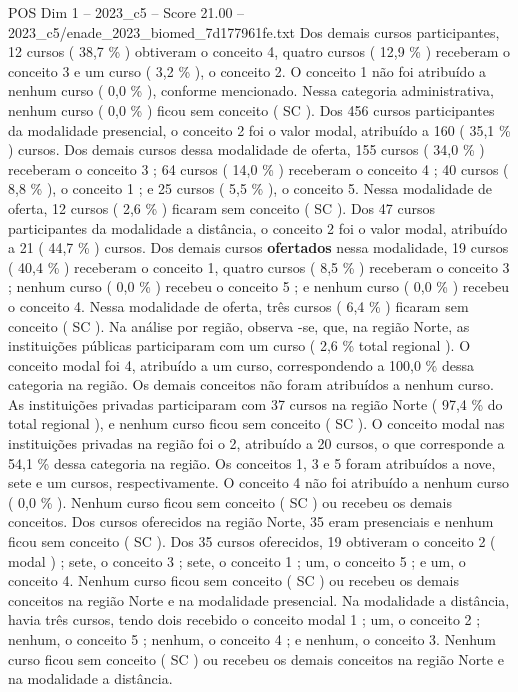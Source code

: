 \begin{textsample}{POS Dim 1 – 2023\_c5 – Score 21.00 – 2023\_c5/enade\_2023\_biomed\_7d177961fe.txt}
Dos demais cursos participantes, 12 cursos ( 38,7 \% ) obtiveram o conceito 4, quatro cursos ( 12,9 \% ) receberam o conceito 3 e um curso ( 3,2 \% ), o conceito 2.
O conceito 1 não foi atribuído a nenhum curso ( 0,0 \% ), conforme mencionado.
Nessa categoria administrativa, nenhum curso ( 0,0 \% ) ficou sem conceito ( SC ).
Dos 456 cursos participantes da modalidade presencial, o conceito 2 foi o valor modal, atribuído a 160 ( 35,1 \% ) cursos.
Dos demais cursos dessa modalidade de oferta, 155 cursos ( 34,0 \% ) receberam o conceito 3 ; 64 cursos ( 14,0 \% ) receberam o conceito 4 ; 40 cursos ( 8,8 \% ), o conceito 1 ; e 25 cursos ( 5,5 \% ), o conceito 5.
Nessa modalidade de oferta, 12 cursos ( 2,6 \% ) ficaram sem conceito ( SC ).
Dos 47 cursos participantes da modalidade a distância, o conceito 2 foi o valor modal, atribuído a 21 ( 44,7 \% ) cursos.
Dos demais cursos \textbf{ofertados} nessa modalidade, 19 cursos ( 40,4 \% ) receberam o conceito 1, quatro cursos ( 8,5 \% ) receberam o conceito 3 ; nenhum curso ( 0,0 \% ) recebeu o conceito 5 ; e nenhum curso ( 0,0 \% ) recebeu o conceito 4.
Nessa modalidade de oferta, três cursos ( 6,4 \% ) ficaram sem conceito ( SC ).
Na análise por região, observa -se, que, na região Norte, as instituições públicas participaram com um curso ( 2,6 \% total regional ).
O conceito modal foi 4, atribuído a um curso, correspondendo a 100,0 \% dessa categoria na região.
Os demais conceitos não foram atribuídos a nenhum curso.
As instituições privadas participaram com 37 cursos na região Norte ( 97,4 \% do total regional ), e nenhum curso ficou sem conceito ( SC ).
O conceito modal nas instituições privadas na região foi o 2, atribuído a 20 cursos, o que corresponde a 54,1 \% dessa categoria na região.
Os conceitos 1, 3 e 5 foram atribuídos a nove, sete e um cursos, respectivamente.
O conceito 4 não foi atribuído a nenhum curso ( 0,0 \% ).
Nenhum curso ficou sem conceito ( SC ) ou recebeu os demais conceitos.
Dos cursos oferecidos na região Norte, 35 eram presenciais e nenhum ficou sem conceito ( SC ).
Dos 35 cursos oferecidos, 19 obtiveram o conceito 2 ( modal ) ; sete, o conceito 3 ; sete, o conceito 1 ; um, o conceito 5 ; e um, o conceito 4.
Nenhum curso ficou sem conceito ( SC ) ou recebeu os demais conceitos na região Norte e na modalidade presencial.
Na modalidade a distância, havia três cursos, tendo dois recebido o conceito modal 1 ; um, o conceito 2 ; nenhum, o conceito 5 ; nenhum, o conceito 4 ; e nenhum, o conceito 3.
Nenhum curso ficou sem conceito ( SC ) ou recebeu os demais conceitos na região Norte e na modalidade a distância.

\end{textsample}
